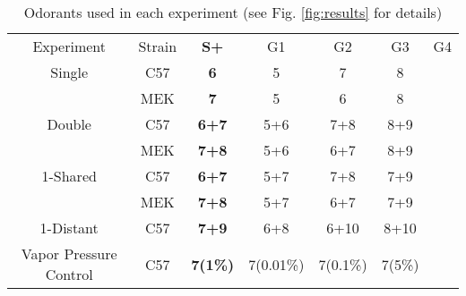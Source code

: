 \label{tab:design}
\begin{table}
    \begin{tabular}{ c c c c c c c }
        Experiment & Strain & \textbf{S+} & G1 & G2 & G3 & G4 \\ 
        Single & C57 & \textbf{6} & 5 & 7 & 8 &   \\ 
         & MEK & \textbf{7} & 5 & 6 & 8 &  \\ 
        Double & C57 & \textbf{6+7} & 5+6 & 7+8 & 8+9 &    \\ 
         & MEK & \textbf{7+8} & 5+6 & 6+7 & 8+9 &   \\ 
        1-Shared & C57 & \textbf{6+7} & 5+7 & 7+8 & 7+9 &  \\ 
         & MEK & \textbf{7+8} & 5+7 & 6+7 & 7+9 &   \\ 
        1-Distant & C57 & \textbf{7+9} & 6+8 & 6+10 & 8+10 &    \\ 
        Vapor Pressure Control & C57 & \textbf{7(1\%)} & 7(0.01\%) & 7(0.1\%) & 7(5\%) &   \\ 
    \end{tabular}
    \caption{Odorants used in each experiment (see Fig. \ref{fig:results} for details)}
\end{table}